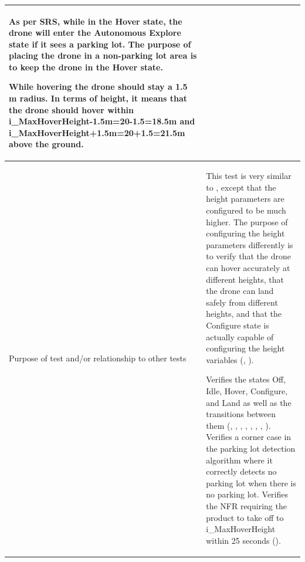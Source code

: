 \documentclass[12pt, titlepage]{article}
\begin{document}
\begin{table}[!h]
\begin{center}
\begin{tabular}{ | m{1.5cm} | m{15cm} | }
As per SRS, while in the Hover state, the drone will enter the Autonomous Explore state if it sees a parking lot. The purpose of placing the drone in a non-parking lot area is to keep the drone in the Hover state.

While hovering the drone should stay a 1.5 m radius. In terms of height, it means that the drone should hover within i\_MaxHoverHeight-1.5m=20-1.5=18.5m and i\_MaxHoverHeight+1.5m=20+1.5=21.5m above the ground.  \\ 
\hline
Purpose of test and/or relationship to other tests & This test is very similar to \nameref{tab:STC_001}, except that the height parameters are configured to be much higher. The purpose of configuring the height parameters differently is to verify that the drone can hover accurately at different heights, that the drone can land safely from different heights, and that the Configure state is actually capable of configuring the height variables (\nameref{GEN_003}, \nameref{GEN_004}).

Verifies the states Off, Idle, Hover, Configure, and Land as well as the transitions between them (\nameref{STA_000}, \nameref{STA_001}, \nameref{STA_004}, \nameref{STA_005}, \nameref{STA_006}, \nameref{TRANS_002}, \nameref{TRANS_003}, \nameref{TRANS_009}). 
Verifies a corner case in the parking lot detection algorithm where it correctly detects no parking lot when there is no parking lot.
Verifies the NFR requiring the product to take off to i\_MaxHoverHeight within 25 seconds (\nameref{PERF_002}). \\ 
\hline
\end{tabular}
\end{center}
\end{table}
\end{document}
